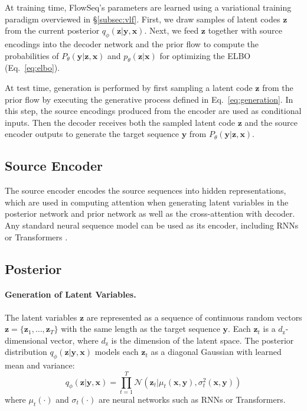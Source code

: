 \documentclass[11pt,a4paper]{article}
\newcommand{\xv}{\mathbf{x}}
\newcommand{\yv}{\mathbf{y}}
\newcommand{\zv}{\mathbf{z}}
\begin{document}
At training time, FlowSeq's parameters are learned using a variational training paradigm overviewed in \S\ref{subsec:vlf}.
First, we draw samples of latent codes $\zv$ from the current posterior $q_{\phi} (\zv|\yv, \xv)$. 
Next, we feed $\zv$ together with source encodings into the decoder network and the prior flow to compute the probabilities of $P_{\theta}(\yv|\zv, \xv)$ and $p_{\theta}(\zv|\xv)$ for optimizing the ELBO (Eq.~\eqref{eq:elbo}).

At test time, generation is performed by first sampling a latent code $\zv$ from the prior flow by executing the generative process defined in Eq.~\eqref{eq:generation}.
In this step, the source encodings produced from the encoder are used as conditional inputs.
Then the decoder receives both the sampled latent code $\zv$ and the source encoder outputs to generate the target sequence $\yv$ from $P_{\theta}(\yv|\zv, \xv)$.

\subsection{Source Encoder}
The source encoder encodes the source sequences into hidden representations, which are used in computing attention when generating latent variables in the posterior network and prior network as well as the cross-attention with decoder. 
Any standard neural sequence model can be used as its encoder, including RNNs \citep{bahdanau2014neural} or Transformers \cite{vaswani2017attention}.

\subsection{Posterior}
\paragraph{Generation of Latent Variables.} The latent variables $\zv$ are represented as a sequence of continuous random vectors $\zv=\{\zv_1, \ldots, \zv_T\}$ with the same length as the target sequence $\mathbf{y}$. Each $\zv_t$ is a $d_{\mathrm{z}}$-dimensional vector, where $d_{\mathrm{z}}$ is the dimension of the latent space. The posterior distribution $q_{\phi} (\zv|\yv, \xv)$ models each $\zv_t$ as a diagonal Gaussian with learned mean and variance:
\begin{equation}\label{eq:posterior}
q_{\phi} (\zv|\yv, \xv) = \prod\limits_{t=1}^{T} \mathcal{N}(\zv_t| \mu_{t}(\xv, \yv), \sigma_{t}^{2}(\xv, \yv))
\end{equation}
where $\mu_{t}(\cdot)$ and $\sigma_{t}(\cdot)$ are neural networks such as RNNs or Transformers.
\end{document}
